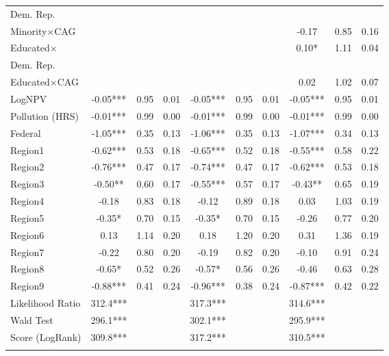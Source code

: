 \documentclass[12pt]{article}
\begin{document}
\begin{table}[H]
{\begin{tabular}{lccc|ccc|ccc}
			 \hspace{10pt}Dem. Rep. & & & & & & & & & \\
			Minority$\times$CAG &       &       &       &       &       &       &  {-0.17} &  {0.85}  & {0.16} \\
			Educated$\times$ &       &       &       &       &       &       & \multirow{2}{*}{0.10*} & \multirow{2}{*}{1.11}  & \multirow{2}{*}{0.04} \\
			\hspace{10pt}Dem. Rep. & & & & & & & & & \\
			Educated$\times$CAG &       &       &       &       &       &       & 0.02  & 1.02  & 0.07 \\
			LogNPV & -0.05*** & 0.95  & 0.01  & -0.05*** & 0.95  & 0.01  & -0.05*** & 0.95  & 0.01 \\
			Pollution (HRS)& -0.01*** & 0.99  & 0.00  & -0.01*** & 0.99  & 0.00  & -0.01*** & 0.99  & 0.00 \\
			Federal & -1.05*** & 0.35  & 0.13  & -1.06*** & 0.35  & 0.13  & -1.07*** & 0.34  & 0.13 \\
			Region1 & -0.62*** & 0.53  & 0.18  & -0.65*** & 0.52  & 0.18  & -0.55*** & 0.58  & 0.22 \\
			Region2 & -0.76*** & 0.47  & 0.17  & -0.74*** & 0.47  & 0.17  & -0.62*** & 0.53  & 0.18 \\
			Region3 & -0.50** & 0.60  & 0.17  & -0.55*** & 0.57  & 0.17  & -0.43** & 0.65  & 0.19 \\
			Region4 & -0.18 & 0.83  & 0.18  & -0.12 & 0.89  & 0.18  & 0.03  & 1.03  & 0.19 \\
			Region5 & -0.35* & 0.70  & 0.15  & -0.35* & 0.70  & 0.15  & -0.26 & 0.77  & 0.20 \\
			Region6 & 0.13  & 1.14  & 0.20  & 0.18  & 1.20  & 0.20  & 0.31  & 1.36  & 0.19 \\
			Region7 & -0.22 & 0.80  & 0.20  & -0.19 & 0.82  & 0.20  & -0.10 & 0.91  & 0.24 \\
			Region8 & -0.65* & 0.52  & 0.26  & -0.57* & 0.56  & 0.26  & -0.46 & 0.63  & 0.28 \\
			Region9 & -0.88*** & 0.41  & 0.24  & -0.96*** & 0.38  & 0.24  & -0.87*** & 0.42  & 0.22 \\			
			\hline 
			Likelihood Ratio & 312.4***  & & &
			317.3*** &  & &
			314.6*** & &\\ 
			Wald Test & 296.1*** & & &
			302.1*** & & &
			295.9*** & &\\
			Score (LogRank) & 309.8*** & & &
			317.2*** &  & &
			310.5*** & &\\
			\hline
			\addlinespace[1ex]
			\multicolumn{3}{l}{\textsuperscript{***}$p\leq0.001$, 
				\textsuperscript{**}$p\leq0.01$, 
				\textsuperscript{*}$p\leq0.05$}
	\end{tabular}}
\end{table}
\end{document}

